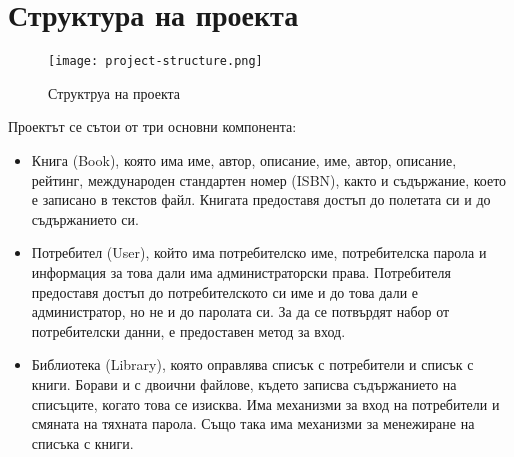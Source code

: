 \section{Структура на проекта}

\begin{figure}[H]
    \texttt{[image: project-structure.png]}
    \centering
    \caption{Структруа на проекта}
    \label{fig:project-structure}
\end{figure}

Проектът се сътои от три основни компонента:
\begin{itemize}
    \item Книга (Book), която има име, автор, описание, име, автор, описание, рейтинг, международен стандартен номер (ISBN), както и съдържание, което е записано в текстов файл. Книгата предоставя достъп до полетата си и до съдържанието си.

    \item Потребител (User), който има потребителско име, потребителска парола и информация за това дали има администраторски права. Потребителя предоставя достъп до потребителското си име и до това дали е администратор, но не и до паролата си. За да се потвърдят набор от потребителски данни, е предоставен метод за вход.

    \item Библиотека (Library), която оправлява списък с потребители и списък с книги. Борави и с двоични файлове, където записва съдържанието на списъците, когато това се изисква. Има механизми за вход на потребители и смяната на тяхната парола. Също така има механизми за менежиране на списъка с книги.
\end{itemize}